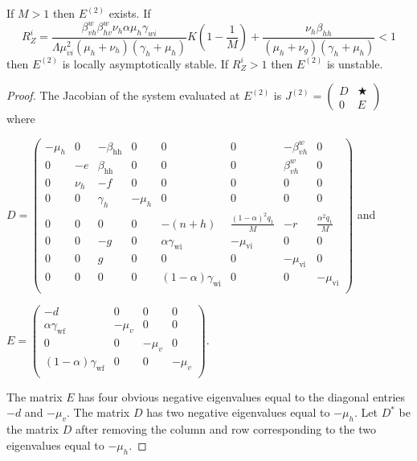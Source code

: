 \documentclass{ws-rv9x6}
\begin{document}
\begin{theorem}
If $M>1$ then $E^{(2)}$ exists. If $$R^i_Z=\dfrac{\beta^w_{vh}\beta^w_{hv}\nu_h\alpha \mu_h\gamma_{wi}}{\Lambda \mu^2_{vi}(\mu_h+\nu_h)(\gamma_h+\mu_h)}K\left(1-\dfrac{1}{M}\right)+\dfrac{\nu_h\beta_{hh}}{(\mu_h+\nu_g)(\gamma_h+\mu_h)}<1$$ then $E^{(2)}$ is locally asymptotically stable. If $R^i_Z>1$ then $E^{(2)}$ is unstable. 
\end{theorem}
\begin{proof}
The Jacobian of the system evaluated at $E^{(2)}$  is $J^{(2)}=\left(
\begin{array}{c|c}
    D & \bigstar\\
    \hline
    0 & E
\end{array}
\right)$ where 

\vspace{0.2in}
\noindent $D=\left(
\begin{array}{cccccccc}
 -\mu _h & 0 & -\beta _{\text{hh}} & 0 & 0 & 0 & -\beta^w_{vh} & 0 \\
 0 & -e & \beta _{\text{hh}} & 0 & 0 & 0 & \beta^w_{vh} & 0 \\
 0 & \nu _h & -f & 0 & 0 & 0 & 0 & 0 \\
 0 & 0 & \gamma _h & -\mu _h & 0 & 0 & 0 & 0 \\
 0 & 0 & 0 & 0 & -(n+h) & \frac{(1-\alpha)^2
   q_1}{M} & -r & \frac{\alpha ^2 q_1}{M} \\
 0 & 0 & -g & 0 & \alpha  \gamma _{\text{wi}} &
   -\mu _{\text{vi}} & 0 & 0 \\
 0 & 0 & g & 0 & 0 & 0 & -\mu _{\text{vi}} & 0 \\
 0 & 0 & 0 & 0 & (1-\alpha) \gamma _{\text{wi}} & 0 & 0 & -\mu _{\text{vi}}\\
\end{array}
\right)$ and

\vspace{0.2in}
\noindent $E=\left(
\begin{array}{cccc}
-d & 0 & 0 & 0 \\
\alpha  \gamma _{\text{wf}} & -\mu _v & 0 & 0 \\
0 & 0 & -\mu _v & 0\\
(1-\alpha) \gamma _{\text{wf}} & 0 & 0 & -\mu _v\\
\end{array}
\right).$

\noindent The matrix $E$ has four obvious negative eigenvalues equal to the diagonal entries $-d$ and $-\mu_v$.
The matrix $D$ has two negative eigenvalues equal to $-\mu_h$. Let $D^*$ be the matrix $D$ after removing the column and row corresponding to the two eigenvalues equal to $-\mu_{h}$. 


\end{proof}
\end{document}
